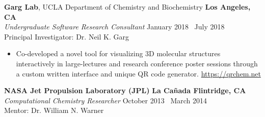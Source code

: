 {\bf Garg Lab}, UCLA Department of Chemistry and Biochemistry \hfill {\bf Los Angeles, CA} \\
{\it Undergraduate Software Research Consultant} \hfill January 2018 \textendash\ July 2018 \\
Principal Investigator: Dr. Neil K. Garg
\begin{itemize} \itemsep -2pt
	\item Co-developed a novel tool for visualizing 3D molecular structures interactively in large-lectures and research conference poster sessions through a custom written interface and unique QR code generator. \textcolor{RoyalBlue}{\href{https://qrchem.net}{https://qrchem.net}}
\end{itemize}

{\bf NASA Jet Propulsion Laboratory (JPL)} \hfill {\bf La Cañada Flintridge, CA} \\
{\it Computational Chemistry Researcher} \hfill October 2013 \textendash\ March 2014 \\
Mentor: Dr. William N. Warner \\